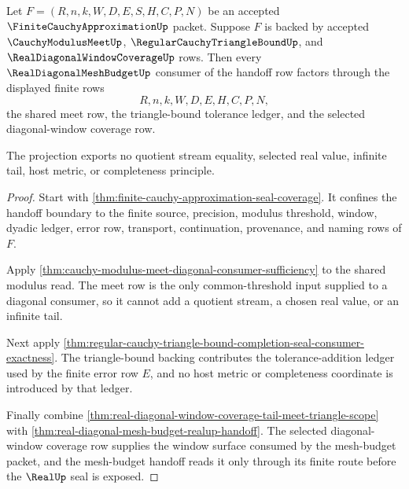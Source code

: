 \begin{theorem}
\label{thm:finite-cauchy-approximation-mesh-budget-projection}
Let $F=(R,n,k,W,D,E,S,H,C,P,N)$ be an accepted $\FiniteCauchyApproximationUp$ packet. Suppose $F$ is backed by accepted $\CauchyModulusMeetUp$, $\RegularCauchyTriangleBoundUp$, and $\RealDiagonalWindowCoverageUp$ rows. Then every $\RealDiagonalMeshBudgetUp$ consumer of the handoff row factors through the displayed finite rows
$$
R,n,k,W,D,E,H,C,P,N,
$$
the shared meet row, the triangle-bound tolerance ledger, and the selected diagonal-window coverage row.

The projection exports no quotient stream equality, selected real value, infinite tail, host metric, or completeness principle.
\end{theorem}
\begin{proof}
Start with \autoref{thm:finite-cauchy-approximation-seal-coverage}. It confines the handoff boundary to the finite source, precision, modulus threshold, window, dyadic ledger, error row, transport, continuation, provenance, and naming rows of $F$.

Apply \autoref{thm:cauchy-modulus-meet-diagonal-consumer-sufficiency} to the shared modulus read. The meet row is the only common-threshold input supplied to a diagonal consumer, so it cannot add a quotient stream, a chosen real value, or an infinite tail.

Next apply \autoref{thm:regular-cauchy-triangle-bound-completion-seal-consumer-exactness}. The triangle-bound backing contributes the tolerance-addition ledger used by the finite error row $E$, and no host metric or completeness coordinate is introduced by that ledger.

Finally combine \autoref{thm:real-diagonal-window-coverage-tail-meet-triangle-scope} with \autoref{thm:real-diagonal-mesh-budget-realup-handoff}. The selected diagonal-window coverage row supplies the window surface consumed by the mesh-budget packet, and the mesh-budget handoff reads it only through its finite route before the $\RealUp$ seal is exposed.
\end{proof}

